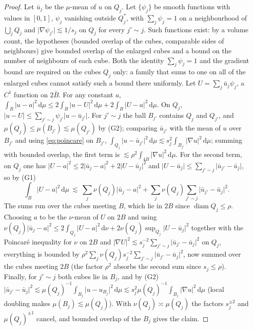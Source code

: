 \documentclass[11pt]{amsart}
\newcommand{\dd}{\,\mathrm{d}}
\newcommand{\abs}[1]{\lvert #1\rvert}
\theoremstyle{plain}
\theoremstyle{definition}
\theoremstyle{remark}
\begin{document}
\begin{proof}
Let $\bar u_j$ be the $\mu$-mean of $u$ on $Q_j$. Let $\{\psi_j\}$ be smooth
functions with values in $[0,1]$, $\psi_j$ vanishing outside $Q_j^*$, with
$\sum_j\psi_j=1$ on a neighbourhood of $\bigcup_jQ_j$ and
$\abs{\nabla\psi_{j'}}\lesssim1/s_j$ on $Q_j$ for every $j'\sim j$. Such
functions exist: by a volume count, the hypotheses (bounded overlap of the
cubes, comparable sides of neighbours) give bounded overlap of the enlarged
cubes and a bound on the number of neighbours of each cube. Both the identity
$\sum_j\psi_j=1$ and the gradient bound are required on the cubes $Q_j$ only: a
family that sums to one on all of the enlarged cubes cannot satisfy such a
bound there uniformly. Let $U=\sum_j\bar u_j\psi_j$, a $C^1$ function on
$2\bar B$. For any
constant $a$, $\int_B\abs{u-a}^2\dd\mu\le2\int_B\abs{u-U}^2\dd\mu+2\int_B\abs{U-a}^2\dd\mu$.
On $Q_j$, $\abs{u-U}\le\sum_{j'\sim j}\psi_{j'}\abs{u-\bar u_{j'}}$. For
$j'\sim j$ the ball $B_{j'}$ contains $Q_j$ and $Q_{j'}$, and
$\mu(Q_j)\le\mu(B_{j'})\lesssim\mu(Q_{j'})$ by (G2); comparing $\bar u_{j'}$
with the mean of $u$ over $B_{j'}$ and using \eqref{eq:poincare} on $B_{j'}$,
$\int_{Q_j}\abs{u-\bar u_{j'}}^2\dd\mu\lesssim s_j^2\int_{B_{j'}}\abs{\nabla u}^2\dd\mu$;
summing with bounded overlap, the first term is $\lesssim\rho^2\int_{4B}
\abs{\nabla u}^2\dd\mu$. For the second term, on $Q_j$ one has
$\abs{U-a}^2\le2\abs{\bar u_j-a}^2+2\abs{U-\bar u_j}^2$ and
$\abs{U-\bar u_j}\le\sum_{j'\sim j}\abs{\bar u_{j'}-\bar u_j}$, so by (G1)
\[
\int_B\abs{U-a}^2\dd\mu\ \lesssim\ \sum_j\nu(Q_j)\abs{\bar u_j-a}^2+
\sum_j\nu(Q_j)\sum_{j'\sim j}\abs{\bar u_{j'}-\bar u_j}^2 .
\]
The sums run over the cubes meeting $B$, which lie in $2B$ since
$\operatorname{diam}Q_j\le\rho$. Choosing $a$ to be the $\nu$-mean of $U$ on $2B$
and using
$\nu(Q_j)\abs{\bar u_j-a}^2\le2\int_{Q_j}\abs{U-a}^2\dd\nu+2\nu(Q_j)\sup_{Q_j}\abs{U-\bar u_j}^2$
together with the Poincar\'e inequality for $\nu$ on $2B$ and
$\abs{\nabla U}^2\lesssim s_j^{-2}\sum_{j'\sim j}\abs{\bar u_{j'}-\bar u_j}^2$ on
$Q_j$, everything is bounded by
$\rho^2\sum_j\nu(Q_j)s_j^{-2}\sum_{j'\sim j}\abs{\bar u_{j'}-\bar u_j}^2$, now
summed over the cubes meeting $2B$ (the factor $\rho^2$ absorbs the second sum
since $s_j\le\rho$). Finally, for
$j'\sim j$ both cubes lie in $B_j$, and by (G2)
$\abs{\bar u_{j'}-\bar u_j}^2\lesssim\mu(Q_j)^{-1}\int_{B_j}\abs{u-u_{B_j}}^2\dd\mu
\lesssim s_j^2\mu(Q_j)^{-1}\int_{B_j}\abs{\nabla u}^2\dd\mu$ (local doubling makes
$\mu(B_j)\lesssim\mu(Q_j)$). With $\nu(Q_j)\asymp\mu(Q_j)$ the factors $s_j^{\pm2}$
and $\mu(Q_j)^{\pm1}$ cancel, and bounded overlap of the $B_j$ gives the claim.
\end{proof}
\end{document}
